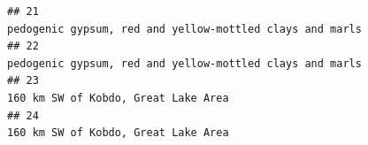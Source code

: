 \documentclass[]{article}
\begin{document}
\begin{verbatim}
## 21                                                                                                                                                                                                                                                                                                                                                                                                                                                                                                                                                                                                                                         pedogenic gypsum, red and yellow-mottled clays and marls
## 22                                                                                                                                                                                                                                                                                                                                                                                                                                                                                                                                                                                                                                         pedogenic gypsum, red and yellow-mottled clays and marls
## 23                                                                                                                                                                                                                                                                                                                                                                                                                                                                                                                                                                                                                                                              160 km SW of Kobdo, Great Lake Area
## 24                                                                                                                                                                                                                                                                                                                                                                                                                                                                                                                                                                                                                                                              160 km SW of Kobdo, Great Lake Area

\end{verbatim}
\end{document}
